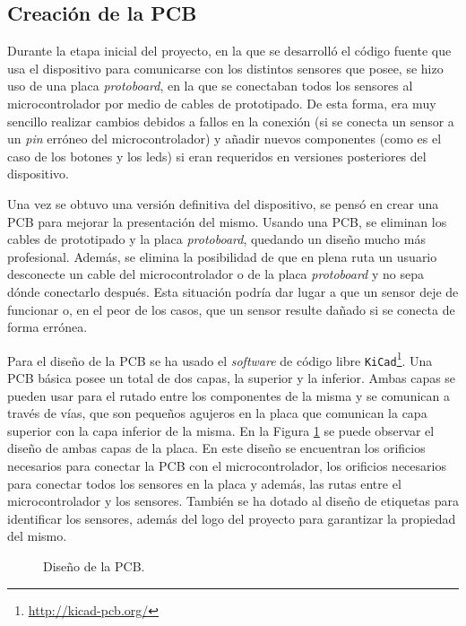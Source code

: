 \subsection{Creación de la \ac{PCB}}

Durante la etapa inicial del proyecto, en la que se desarrolló el código fuente que usa el dispositivo para comunicarse con los distintos sensores que posee, se hizo uso de una placa \textit{protoboard}, en la que se conectaban todos los sensores al microcontrolador por medio de cables de prototipado. De esta forma, era muy sencillo realizar cambios debidos a fallos en la conexión (si se conecta un sensor a un \textit{pin} erróneo del microcontrolador) y añadir nuevos componentes (como es el caso de los botones y los leds) si eran requeridos en versiones posteriores del dispositivo.

Una vez se obtuvo una versión definitiva del dispositivo, se pensó en crear una \ac{PCB} para mejorar la presentación del mismo. Usando una \ac{PCB}, se eliminan los cables de prototipado y la placa \textit{protoboard}, quedando un diseño mucho más profesional. Además, se elimina la posibilidad de que en plena ruta un usuario desconecte un cable del microcontrolador o de la placa \textit{protoboard} y no sepa dónde conectarlo después. Esta situación podría dar lugar a que un sensor deje de funcionar o, en el peor de los casos, que un sensor resulte dañado si se conecta de forma errónea. 

Para el diseño de la \ac{PCB} se ha usado el \textit{software} de código libre \texttt{KiCad}\footnote{\url{http://kicad-pcb.org/}}. Una \ac{PCB} básica posee un total de dos capas, la superior y la inferior. Ambas capas se pueden usar para el rutado entre los componentes de la misma y se comunican a través de vías, que son pequeños agujeros en la placa que comunican la capa superior con la capa inferior de la misma. En la Figura \ref{fig:pcb_design} se puede observar el diseño de ambas capas de la placa. En este diseño se encuentran los orificios necesarios para conectar la \ac{PCB} con el microcontrolador, los orificios necesarios para conectar todos los sensores en la placa y además, las rutas entre el microcontrolador y los sensores. También se ha dotado al diseño de etiquetas para identificar los sensores, además del logo del proyecto para garantizar la propiedad del mismo. 

\begin{figure}
 \centering
 \caption{Diseño de la \ac{PCB}.}
 \label{fig:pcb_design}
\end{figure}

